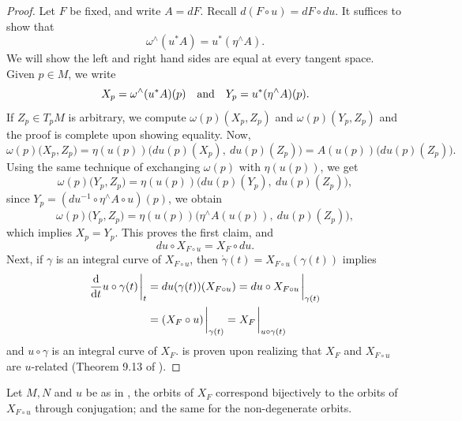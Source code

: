 \documentclass[../main-v2-manifolds.tex]{subfiles}
\begin{document}
\begin{proof}
    Let $F$ be fixed, and write $A = dF$. Recall $d(F\circ u) = dF\circ du$. It suffices to show that
    \begin{equation}
        \omega^{\wedge}(u^* A) = u^*(\eta^{\wedge} A).
        \label{eq:reduction 2 eq3}
    \end{equation}
    We will show the left and right hand sides are equal at every tangent space. Given $p\in M$, we write
    \[X_p = \omega^{\wedge}(u^* A)(p) \qqtext{and} Y_p = u^*(\eta^{\wedge} A)(p).\]
    If $Z_p\in T_pM$ is arbitrary, we compute $\omega(p)(X_p, Z_p)$ and $\omega(p)(Y_p, Z_p)$ and the proof is complete upon showing equality. Now,
    \[\omega(p)\biggl(X_p, Z_p\biggr) = \eta(u(p))\biggl(du(p)(X_p),\: du(p)(Z_p)\biggr)= A(u(p))\biggl(du(p)(Z_p)\biggr).\]
    Using the same technique of exchanging $\omega(p)$ with $\eta(u(p))$, we get
    \[
        \omega(p)\biggl(Y_p, Z_p\biggr) = \eta(u(p))\biggl(du(p)(Y_p),\: du(p)(Z_p)\biggr),
    \]
    since $Y_p = (du^{-1}\circ \eta^{\wedge}A \circ u)(p)$, we obtain
    \[
        \omega(p)\biggl(Y_p, Z_p\biggr) = \eta(u(p))\biggl(\eta^{\wedge}A(u(p)),\: du(p)(Z_p)\biggr),
    \]
    which implies $X_p = Y_p$. This proves the first claim, and 
    \[
        du\circ X_{F\circ u} = X_F\circ du.
    \]
    Next, if $\gamma$ is an integral curve of $X_{F\circ u}$, then $\mathring{\gamma}(t) = X_{F\circ u}(\gamma(t))$ implies
    \begin{align*}
        \dv{t}u\circ \gamma(t)\eval_t &= du(\gamma(t))(X_{F\circ u}) = du\circ X_{F\circ u}\eval_{\gamma(t)} \\
        &= (X_F\circ u)\eval_{\gamma(t)} = X_F\eval_{u\circ \gamma(t)}
    \end{align*}
    and $u\circ \gamma$ is an integral curve of $X_F$.  is proven upon realizing that $X_F$ and $X_{F\circ u}$ are $u$-related (Theorem 9.13 of \cite{Lee2013Introduction}).
\end{proof}
\begin{corollary}
    Let $M,N$ and $u$ be as in , the orbits of $X_F$ correspond bijectively to the orbits of $X_{F\circ u}$ through conjugation; and the same for the non-degenerate orbits.
\end{corollary}


\ifSubfilesClassLoaded{%
}{}
\end{document}
